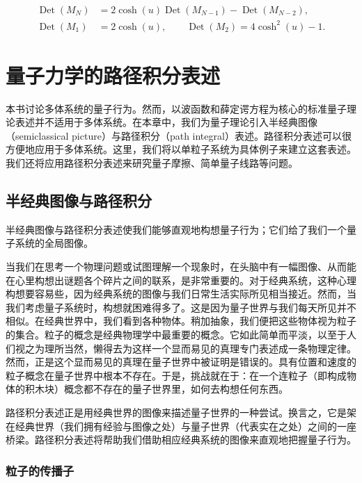 \begin{align*}
\operatorname{Det}(M_N) &= 2\cosh(u)\operatorname{Det}(M_{N-1}) - \operatorname{Det}(M_{N-2}),\\
\operatorname{Det}(M_1) &= 2\cosh(u), \qquad \operatorname{Det}(M_2) = 4\cosh^2(u) - 1.
\end{align*}
\chapter{量子力学的路径积分表述}

本书讨论多体系统的量子行为。然而，以波函数和薛定谔方程为核心的标准量子理论表述并不适用于多体系统。在本章中，我们为量子理论引入半经典图像（semiclassical picture）与路径积分（path integral）表述。路径积分表述可以很方便地应用于多体系统。这里，我们将以单粒子系统为具体例子来建立这套表述。我们还将应用路径积分表述来研究量子摩擦、简单量子线路等问题。

\section{半经典图像与路径积分}

\begin{keypoints}
\item 半经典图像与路径积分表述使我们能够直观地构想量子行为；它们给了我们一个量子系统的全局图像。
\end{keypoints}

当我们在思考一个物理问题或试图理解一个现象时，在头脑中有一幅图像、从而能在心里构想出谜题各个碎片之间的联系，是非常重要的。对于经典系统，这种心理构想要容易些，因为经典系统的图像与我们日常生活实际所见相当接近。然而，当我们考虑量子系统时，构想就困难得多了。这是因为量子世界与我们每天所见并不相似。在经典世界中，我们看到各种物体。稍加抽象，我们便把这些物体视为粒子的集合。粒子的概念是经典物理学中最重要的概念。它如此简单而平淡，以至于人们视之为理所当然，懒得去为这样一个显而易见的真理专门表述成一条物理定律。然而，正是这个显而易见的真理在量子世界中被证明是错误的。具有位置和速度的粒子概念在量子世界中根本不存在。于是，挑战就在于：在一个连粒子（即构成物体的积木块）概念都不存在的量子世界里，如何去构想任何东西。

路径积分表述正是用经典世界的图像来描述量子世界的一种尝试。换言之，它是架在经典世界（我们拥有经验与图像之处）与量子世界（代表实在之处）之间的一座桥梁。路径积分表述将帮助我们借助相应经典系统的图像来直观地把握量子行为。

\subsection{粒子的传播子}

